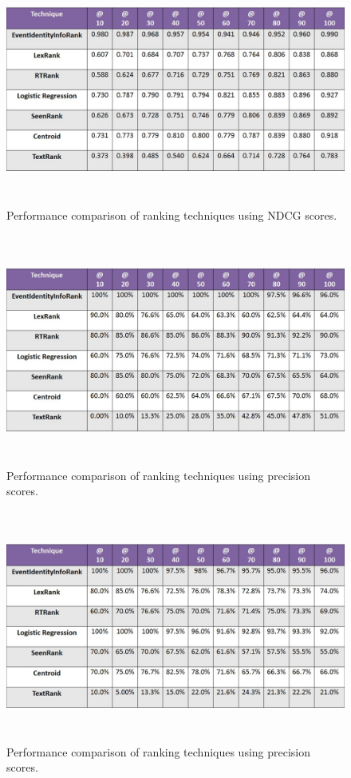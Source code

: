 \begin{figure}[htbp]
\centering
\includegraphics[height=3in,width=5.5in]{Figures/sydneysiegecorrectedndcg.jpg}
\caption{Performance comparison of ranking techniques using NDCG scores.}
\label{sydneysiegendcgtable}
\end{figure}

\begin{figure}[htbp]
\centering
\includegraphics[height=3in,width=5.5in]{Figures/MillionsMarchNycCorrectedPrecision.jpg}
\caption{Performance comparison of ranking techniques using precision scores.}
\label{millionsmarchnycprecisiontable}
\end{figure}

\begin{figure}[htbp]
\centering
\includegraphics[height=3in,width=5.5in]{Figures/sydneysiegeprecisioncorrected.jpg}
\caption{Performance comparison of ranking techniques using precision scores.}
\label{sydneysiegeprecisiontable}
\end{figure}

